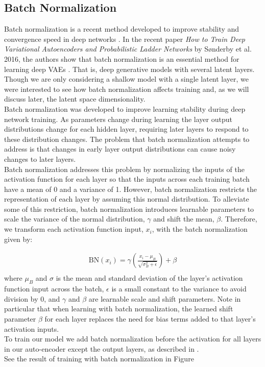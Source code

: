 \documentclass{article} %
\begin{document}


\subsection{Batch Normalization}
Batch normalization is a recent method developed to improve stability and convergence speed in deep networks \cite{Ioffe2015}. In the recent paper \textit{How to Train Deep Variational Autoencoders and Probabilistic Ladder Networks} by S\o nderby et al. 2016, the authors show that batch normalization is an essential method for learning deep VAEs \cite{Sonderby2016}. That is, deep generative models with several latent layers. Though we are only considering a shallow model with a single latent layer, we were interested to see how batch normalization affects training and, as we will discuss later, the latent space dimensionality.\\
Batch normalization was developed to improve learning stability during deep network training. As parameters change during learning the layer output distributions change for each hidden layer, requiring later layers to respond to these distribution changes. The problem that batch normalization attempts to address is that changes in early layer output distributions can cause noisy changes to later layers.\\
Batch normalization addresses this problem by normalizing the inputs of the activation function for each layer so that the inputs across each training batch have a mean of 0 and a variance of 1. However, batch normalization restricts the representation of each layer by assuming this normal distribution. To alleviate some of this restriction, batch normalization introduces learnable parameters to scale the variance of the normal distribution, $\gamma$ and shift the mean, $\beta$. Therefore, we transform each activation function input, $x_i$, with the batch normalization given by:

\begin{align*}
    \text{BN}(x_i)=\gamma(\frac{x_i-\mu_B}{\sqrt{\sigma_B^2+\epsilon}})+\beta\\
\end{align*} 
where $\mu_B$ and $\sigma$ is the mean and standard deviation of the layer's activation function input across the batch, $\epsilon$ is a small constant to the variance to avoid division by 0, and $\gamma$ and $\beta$ are learnable scale and shift parameters. Note in particular that when learning with batch normalization, the learned shift parameter $\beta$ for each layer replaces the need for bias terms added to that layer's activation inputs. \\
To train our model we add batch normalization before the activation for all layers in our auto-encoder except the output layers, as described in \cite{Sonderby2016}. \\
See the result of training with batch normalization in Figure %
\end{document}

